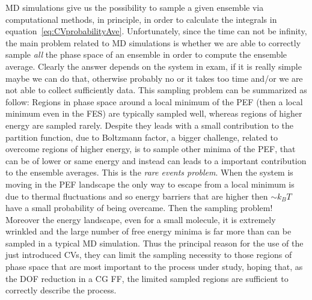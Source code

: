 \ac{MD} simulations give us the possibility to sample a given ensemble via computational methods, in principle, in order to calculate the integrals in equation~\eqref{eq:CVprobabilityAve}. Unfortunately, since the time can not be infinity, the main problem related to \ac{MD} simulations is whether we are able to correctly sample \textit{all} the phase space of an ensemble in order to compute the ensemble average. Clearly the answer depends on the system in exam, if it is really simple maybe we can do that, otherwise probably no or it takes too time and/or we are not able to collect sufficiently data. This sampling problem can be summarized as follow: Regions in phase space around a local minimum of the \ac{PEF} (then a local minimum even in the \ac{FES}) are typically sampled well, whereas regions of higher energy are sampled rarely. Despite they leads with a small contribution to the partition function, due to Boltzmann factor, a bigger challenge, related to overcome regions of higher energy, is to sample other minima of the \ac{PEF}, that can be of lower or same energy and instead can leads to a important contribution to the ensemble averages. This is the \textit{rare events problem}. When the system is moving in the \ac{PEF} landscape the only way to escape from a local minimum is due to thermal fluctuations and so energy barriers that are higher then $\sim k_B T$ have a small probability of being overcame. Then the sampling problem! Moreover the energy landscape, even for a small molecule, it is extremely wrinkled and the large number of free energy minima is far more than can be sampled in a typical \ac{MD} simulation. Thus the principal reason for the use of the just introduced \acp{CV}, they can limit the sampling necessity to those regions of phase space that are most important to the process under study, hoping that, as the \ac{DOF} reduction in a \ac{CG} \ac{FF}, the limited sampled regions are sufficient to correctly describe the process.

